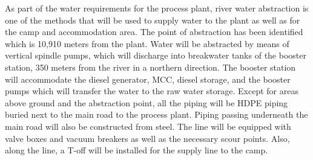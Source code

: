 \documentclass{article}%
\begin{document}
\newline%
%
\newline%
%
As part of the water requirements for the process plant, river water abstraction is one of the methods that will be used to supply water to the plant as well as for the camp and accommodation area. The point of abstraction has been identified which is 10,910 meters from the plant. 
Water will be abstracted by means of vertical spindle pumps, which will discharge into breakwater tanks of the booster station, 350 meters from the river in a northern direction. The booster station will accommodate the diesel generator, MCC, diesel storage, and the booster pumps which will transfer the water to the raw water storage. 
Except for areas above ground and the abstraction point, all the piping will be HDPE piping buried next to the main road to the process plant.  Piping passing underneath the main road will also be constructed from steel. The line will be equipped with valve boxes and vacuum breakers as well as the necessary scour points. Also, along the line, a T-off will be installed for the supply line to the camp.

%
\end{document}
